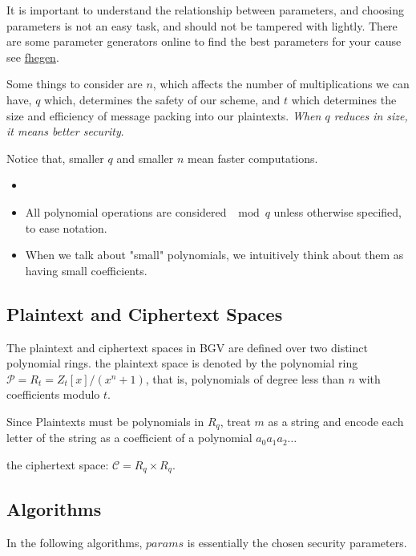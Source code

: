 \begin{remark}
    It is important to understand the relationship between parameters, and choosing parameters 
    is not an easy task, and should not be tampered with lightly.
    There are some parameter generators online to find the best parameters
     for your cause see \href{https://github.com/Crypto-TII/fhegen}{fhegen}.
    
    Some things to consider are $n$, which affects the number of multiplications we can have,
    $q$ which, determines the safety of our scheme, and $t$ which determines 
    the size and efficiency of message packing into our plaintexts. 
    \emph{When $q$ reduces in size, it means better security}.    

    Notice that, smaller $q$ and smaller $n$ mean faster computations.
\end{remark}


\begin{remark}
    \begin{itemize}
        \item \red{check: I think we can treat coefficients as they were in $(0,q]$.}
        \item All polynomial operations are considered $\mod q$
         unless otherwise specified, to ease notation.
         \item When we talk about "small" polynomials, 
         we intuitively think about them as having small coefficients.
    \end{itemize}
\end{remark}

\subsection{Plaintext and Ciphertext Spaces}
The plaintext and ciphertext spaces in BGV are defined over two distinct
polynomial rings. the plaintext space is denoted by the polynomial
ring $\mathcal{P}=R_{t}= Z_{t}\left[x\right]/\left(x^{n}+1\right)$,
that is, polynomials of degree less than $n$ with coefficients modulo
$t$. 
\begin{remark}
    Since Plaintexts must be polynomials in $R_q$, treat 
    $m$ as a string and encode each letter of the string as a coefficient of a polynomial
    $a_{0}a_{1}a_{2}\dots$
\end{remark}


the ciphertext space: $\mathcal{C}=R_q \times R_q$. 

\subsection{Algorithms}
In the following algorithms, $params$ is essentially the chosen security parameters. 
